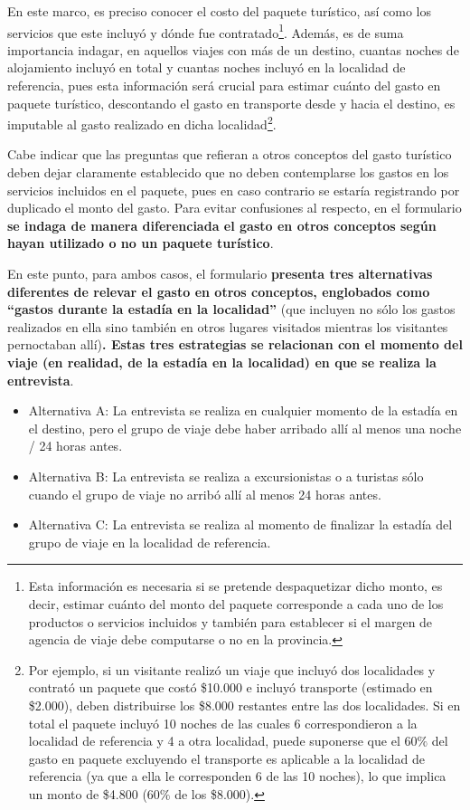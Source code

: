 \documentclass[
]{book}
\begin{document}
En este marco, es preciso conocer el costo del paquete turístico, así como los servicios que este incluyó y dónde fue contratado\footnote{Esta información es necesaria si se pretende despaquetizar dicho monto, es decir, estimar cuánto del monto del paquete corresponde a cada uno de los productos o servicios incluidos y también para establecer si el margen de agencia de viaje debe computarse o no en la provincia.}. Además, es de suma importancia indagar, en aquellos viajes con más de un destino, cuantas noches de alojamiento incluyó en total y cuantas noches incluyó en la localidad de referencia, pues esta información será crucial para estimar cuánto del gasto en paquete turístico, descontando el gasto en transporte desde y hacia el destino, es imputable al gasto realizado en dicha localidad\footnote{Por ejemplo, si un visitante realizó un viaje que incluyó dos localidades y contrató un paquete que costó \$10.000 e incluyó transporte (estimado en \$2.000), deben distribuirse los \$8.000 restantes entre las dos localidades. Si en total el paquete incluyó 10 noches de las cuales 6 correspondieron a la localidad de referencia y 4 a otra localidad, puede suponerse que el \(60\%\) del gasto en paquete excluyendo el transporte es aplicable a la localidad de referencia (ya que a ella le corresponden 6 de las 10 noches), lo que implica un monto de \$4.800 (\(60\%\) de los \$8.000).}.

Cabe indicar que las preguntas que refieran a otros conceptos del gasto turístico deben dejar claramente establecido que no deben contemplarse los gastos en los servicios incluidos en el paquete, pues en caso contrario se estaría registrando por duplicado el monto del gasto. Para evitar confusiones al respecto, en el formulario \textbf{se indaga de manera diferenciada el gasto en otros conceptos según hayan utilizado o no un paquete turístico}.

En este punto, para ambos casos, el formulario \textbf{presenta tres alternativas diferentes de relevar el gasto en otros conceptos, englobados como ``gastos durante la estadía en la localidad''} (que incluyen no sólo los gastos realizados en ella sino también en otros lugares visitados mientras los visitantes pernoctaban allí)\textbf{. Estas tres estrategias se relacionan con el momento del viaje (en realidad, de la estadía en la localidad) en que se realiza la entrevista}.

\begin{itemize}
\item
  Alternativa A: La entrevista se realiza en cualquier momento de la estadía en el destino, pero el grupo de viaje debe haber arribado allí al menos una noche / 24 horas antes.
\item
  Alternativa B: La entrevista se realiza a excursionistas o a turistas sólo cuando el grupo de viaje no arribó allí al menos 24 horas antes.
\item
  Alternativa C: La entrevista se realiza al momento de finalizar la estadía del grupo de viaje en la localidad de referencia.
\end{itemize}
\end{document}
